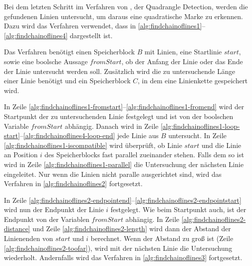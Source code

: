 Bei dem letzten Schritt im Verfahren von \citeauthor{hirzer08}, der Quadrangle Detection, werden die gefundenen Linien
 untersucht, um daraus eine quadratische Marke zu erkennen. Dazu wird das Verfahren 
 verwendet, dass in \autoref{alg:findchainoflines1}--\autoref{alg:findchainoflines4} dargestellt ist.



Das Verfahren benötigt einen Speicherblock $B$ mit Linien, eine Startlinie $\mathit{start}$, sowie eine boolsche
 Aussage $\mathit{fromStart}$, ob der Anfang der Linie oder das Ende der Linie untersucht werden soll. Zusätzlich wird
 die zu untersuchende Länge einer Linie benötigt und ein Speicherblock $C$, in dem eine Linienkette gespeichert wird.

In Zeile \ref{alg:findchainoflines1-fromstart}--\ref{alg:findchainoflines1-fromend} wird der Startpunkt der zu
 untersuchenden Linie festgelegt und ist von der boolschen Variable $\mathit{fromStart}$ abhängig. Danach wird in Zeile
 \ref{alg:findchainoflines1-loop-start}--\ref{alg:findchainoflines4-loop-end} jede Linie aus $B$ untersucht. In Zeile
 \ref{alg:findchainoflines1-iscompatible} wird überprüft, ob Linie $\mathit{start}$ und die Linie an Position $i$ des
 Speicherblocks fast parallel zueinander stehen. Falls dem so ist wird in Zeile \ref{alg:findchainoflines1-parallel}
 die Untersuchung der nächsten Linie eingeleitet. Nur wenn die Linien nicht paralle ausgerichtet sind, wird das
 Verfahren in \autoref{alg:findchainoflines2} fortgesetzt.



In Zeile \ref{alg:findchainoflines2-endpointend}--\ref{alg:findchainoflines2-endpointstart} wird nun der Endpunkt der
 Linie $i$ festgelegt. Wie beim Startpunkt auch, ist der Endpunkt von der Variablen $\mathit{fromStart}$ abhängig. In
 Zeile \ref{alg:findchainoflines2-distance} und Zeile \ref{alg:findchainoflines2-length} wird dann der Abstand der
 Linienenden von $\mathit{start}$ und $i$ berechnet. Wenn der Abstand zu groß ist
 (Zeile \ref{alg:findchainoflines2-toofar}), wird mit der nächsten Linie die Untersuchung wiederholt. Andernfalls wird
 das Verfahren in \autoref{alg:findchainoflines3} fortgesetzt.



